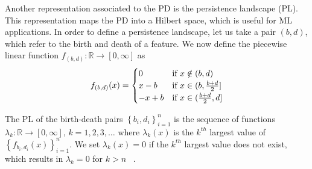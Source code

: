 \documentclass{article}
\begin{document}
Another representation associated to the PD is the persistence landscape
(PL). This representation maps the PD into a
Hilbert space, which is useful for ML applications. In order to define a persistence landscape, let
us take a pair $(b,d)$, which refer to the birth and death of a feature. We now define the piecewise
linear function $f_{(b,d)}:\mathbb{R} \to [0, \infty]$ as
\begin{equation}
  \label{eq:piecewise_linear_landscape}
  f_{(b,d)}(x)=
  \begin{cases}
    0 & \text{if }x \notin (b,d)\\ x-b & \text{if }x\in (b,{b+d\over 2}]\\ -x+b & \text{if }x\in
      ({b+d\over 2},d]
  \end{cases}
\end{equation}


The PL of the birth-death pairs $\left\{b_i,d_i\right\}_{i=1}^{n}$ is the sequence of functions
$\lambda_k:\mathbb{R}\to [0,\infty]$, $k=1,2,3,\ldots$ where $\lambda_k(x)$ is the $k^{th}$ largest
value of $\left\{f_{b_i, d_i}(x)\right\}^{n}_{i=1}$. We set $\lambda_k(x)=0$ if the $k^{th}$ largest
value does not exist, which results in $\lambda_k=0$ for $k>n$ ~\citep{bubenik2015statistical, bubenik2020persistence}.

\end{document}
